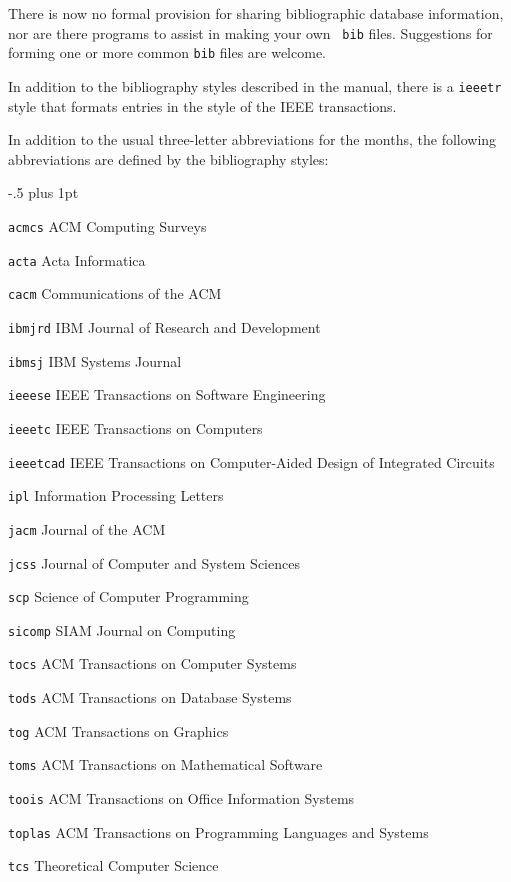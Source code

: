 There is now no formal provision for sharing bibliographic database
information, nor are there programs to assist in making your own {\tt
bib} files.  Suggestions for forming one or more common {\tt bib} files
are welcome.

In addition to the bibliography styles described in the manual, there
is a {\tt ieeetr} style that formats entries in the style of the IEEE
transactions.

In addition to the usual three-letter abbreviations for the months, the
following abbreviations are defined by the bibliography styles:
\begin{list}{}{ \itemindent-.5\leftmargin
       \itemsep=2pt plus 1pt
       \let\makelabel\descriptionlabel}\it
\item[\tt acmcs] ACM Computing Surveys
\item[\tt acta] Acta Informatica
\item[\tt cacm] Communications of the ACM
\item[\tt ibmjrd] IBM Journal of Research and Development
\item[\tt ibmsj] IBM Systems Journal
\item[\tt ieeese] IEEE Transactions on Software Engineering
\item[\tt ieeetc] IEEE Transactions on Computers
\item[\tt ieeetcad]
 IEEE Transactions on Computer-Aided Design of Integrated Circuits
\item[\tt ipl] Information Processing Letters
\item[\tt jacm] Journal of the ACM
\item[\tt jcss] Journal of Computer and System Sciences
\item[\tt scp] Science of Computer Programming
\item[\tt sicomp] SIAM Journal on Computing
\item[\tt tocs] ACM Transactions on Computer Systems
\item[\tt tods] ACM Transactions on Database Systems
\item[\tt tog] ACM Transactions on Graphics
\item[\tt toms] ACM Transactions on Mathematical Software
\item[\tt toois] ACM Transactions on Office Information Systems
\item[\tt toplas] ACM Transactions on Programming Languages and Systems
\item[\tt tcs] Theoretical Computer Science
\end{list}

